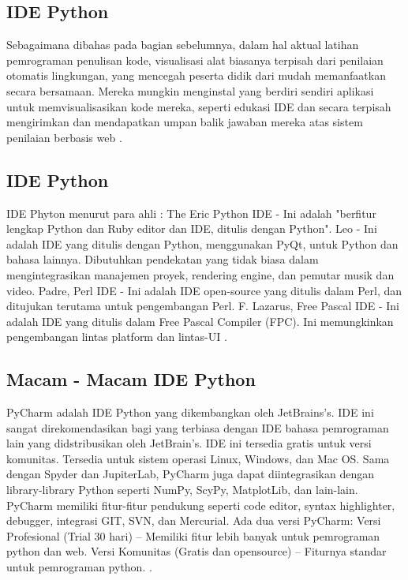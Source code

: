 \subsection{IDE Python}
Sebagaimana dibahas pada bagian sebelumnya, dalam hal aktual latihan pemrograman penulisan kode, visualisasi alat biasanya terpisah dari penilaian otomatis lingkungan, yang mencegah peserta didik dari mudah memanfaatkan secara bersamaan. Mereka mungkin menginstal yang berdiri sendiri aplikasi untuk memvisualisasikan kode mereka, seperti edukasi IDE dan secara terpisah mengirimkan dan mendapatkan umpan balik jawaban mereka atas sistem penilaian berbasis web \cite{helminen2010jype}.

\subsection{IDE Python}
IDE Phyton menurut para ahli :
The Eric Python IDE - Ini adalah "berfitur lengkap Python dan Ruby editor dan IDE, ditulis dengan Python".
Leo - Ini adalah IDE yang ditulis dengan Python, menggunakan PyQt, untuk Python dan bahasa lainnya. Dibutuhkan pendekatan yang tidak biasa dalam mengintegrasikan manajemen proyek, rendering engine, dan pemutar musik dan video.
Padre, Perl IDE - Ini adalah IDE open-source yang ditulis dalam Perl, dan ditujukan terutama untuk pengembangan Perl.
 F. Lazarus, Free Pascal IDE - Ini adalah IDE yang ditulis dalam Free Pascal Compiler (FPC). Ini memungkinkan pengembangan lintas platform dan lintas-UI \cite{swarnkar2013survey}.

\subsection{Macam - Macam IDE Python}
PyCharm adalah IDE Python yang dikembangkan oleh JetBrains’s. IDE ini sangat direkomendasikan bagi yang terbiasa dengan IDE bahasa pemrograman lain yang didstribusikan oleh JetBrain’s. IDE ini tersedia gratis untuk versi komunitas. Tersedia untuk sistem operasi Linux, Windows, dan Mac OS. Sama dengan Spyder dan JupiterLab, PyCharm juga dapat diintegrasikan dengan library-library Python seperti NumPy, ScyPy, MatplotLib, dan lain-lain. PyCharm memiliki fitur-fitur pendukung seperti code editor, syntax highlighter, debugger, integrasi GIT, SVN, dan Mercurial.
Ada dua versi PyCharm:
Versi Profesional (Trial 30 hari) – Memiliki fitur lebih banyak untuk pemrograman python dan web.
Versi Komunitas (Gratis dan opensource) – Fiturnya standar untuk pemrograman python. \cite{tateosian2015beginning}.

